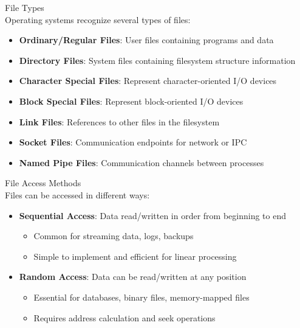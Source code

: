 
\begin{theorem}{File Types}\\
    Operating systems recognize several types of files:
    \begin{itemize}
        \item \textbf{Ordinary/Regular Files}: User files containing programs and data
        \item \textbf{Directory Files}: System files containing filesystem structure information
        \item \textbf{Character Special Files}: Represent character-oriented I/O devices
        \item \textbf{Block Special Files}: Represent block-oriented I/O devices
        \item \textbf{Link Files}: References to other files in the filesystem
        \item \textbf{Socket Files}: Communication endpoints for network or IPC
        \item \textbf{Named Pipe Files}: Communication channels between processes
    \end{itemize}
\end{theorem}

\begin{corollary}{File Access Methods}\\
    Files can be accessed in different ways:
    \begin{itemize}
        \item \textbf{Sequential Access}: Data read/written in order from beginning to end
            \begin{itemize}
                \item Common for streaming data, logs, backups
                \item Simple to implement and efficient for linear processing
            \end{itemize}
        \item \textbf{Random Access}: Data can be read/written at any position
            \begin{itemize}
                \item Essential for databases, binary files, memory-mapped files
                \item Requires address calculation and seek operations
            \end{itemize}
    \end{itemize}
\end{corollary}


